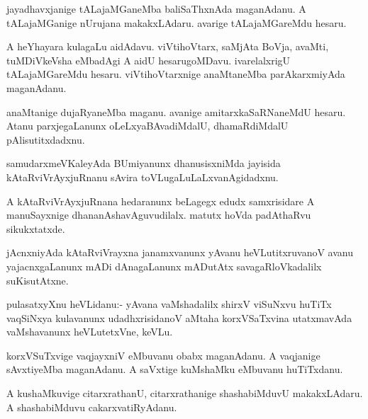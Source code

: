 \documentclass{article}
\begin{document}
\begin{mn}
jayadhavxjanige tALajaMGaneMba baliSaThxnAda maganAdanu. A
tALajaMGanige nUrujana makakxLAdaru. avarige tALajaMGareMdu hesaru.
\end{mn}

\begin{mn}%
A heYhayara kulagaLu aidAdavu. viVtihoVtarx, saMjAta BoVja, avaMti,
tuMDiVkeVsha eMbadAgi A aidU hesarugoMDavu. ivarelalxrigU
tALajaMGareMdu hesaru. viVtihoVtarxnige anaMtaneMba parAkarxmiyAda maganAdanu.
\end{mn}

\begin{mn}
anaMtanige dujaRyaneMba maganu. avanige amitarxkaSaRNaneMdU
hesaru. Atanu parxjegaLanunx oLeLxyaBAvadiMdalU, dhamaRdiMdalU pAlisutitxdadxnu.
\end{mn}

\begin{mn}
samudarxmeVKaleyAda BUmiyanunx dhanusisxniMda jayisida
kAtaRviVrAyxjuRnanu sAvira toVLugaLuLaLxvanAgidadxnu.
\end{mn}

\begin{mn}
A kAtaRviVrAyxjuRnana hedaranunx beLagegx edudx samxrisidare A
manuSayxnige dhananAshavAguvudilalx. matutx hoVda padAthaRvu sikukxtatxde.
\end{mn}

\begin{mn}
jAcnxniyAda kAtaRviVrayxna janamxvanunx yAvanu heVLutitxruvanoV avanu
yajacnxgaLanunx mADi dAnagaLanunx mADutAtx savagaRloVkadalilx suKisutAtxne.
\end{mn}

%
%


\begin{mn}%
pulasatxyXnu heVLidanu:- yAvana vaMshadalilx shirxV viSuNxvu huTiTx
vaqSiNxya kulavanunx udadhxrisidanoV aMtaha korxVSaTxvina utatxmavAda
vaMshavanunx heVLutetxVne, keVLu.
\end{mn}

\begin{mn}
korxVSuTxvige vaqjayxniV eMbuvanu obabx maganAdanu. A vaqjanige
sAvxtiyeMba maganAdanu. A saVxtige kuMshaMku eMbuvanu huTiTxdanu.
\end{mn}

\begin{mn}
A kushaMkuvige citarxrathanU, citarxrathanige shashabiMduvU
makakxLAdaru. A shashabiMduvu cakarxvatiRyAdanu.
\end{mn}
\end{document}
